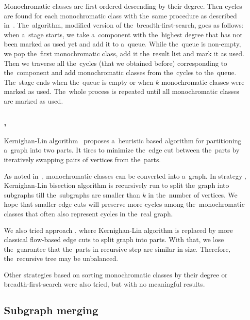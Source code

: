 Monochromatic classes are first ordered descending by their degree.
Then cycles are found for each monochromatic class with the~same procedure
as described in~.
The~algorithm, modified version of the~breadth-first-search, goes as follows:
when a~stage starts, we take a~component with the~highest degree
that has not been marked as used yet and add it to a~queue.
While the~queue is non-empty, we pop the~first monochromatic class,
add it the~result list and mark it as used.
Then we traverse all the~cycles (that we obtained before)
corresponding to the~component
and add monochromatic classes from the~cycles to the~queue.
The~stage ends when the~queue is empty or when \( k \) monochromatic classes
were marked as used. The~whole process is repeated until
all monochromatic classes are marked as used.

\subsubsection*{\KernighanLin{}, \Cuts{}}

Kernighan-Lin algorithm~\cite{kernighan_lin} proposes a~heuristic based algorithm
for partitioning a~graph into two parts. It tires to minimize the~edge cut between
the~parts by iteratively swapping pairs of vertices from the~parts.

As noted in~,
monochromatic classes can be converted into a~graph.
In strategy \KernighanLin{},
Kernighan-Lin bisection algorithm is recursively run to split the~graph
into subgraphs till the~subgraphs are smaller than \( k \) in the~number of vertices.
We hope that smaller-edge cuts will preserve more cycles among
the~monochromatic classes that often also represent cycles in the~real graph.

We also tried approach \Cuts{}, where Kernighan-Lin algorithm is replaced by
more classical flow-based edge cuts to split graph into parts.
With that, we lose the~guarantee that the~parts in recursive step
are similar in size. Therefore, the~recursive tree may be unbalanced.

Other strategies based on
sorting monochromatic classes by their degree
or breadth-first-search were also tried,
but with no meaningful results.



\subsection{Subgraph merging}%
\label{sec:merging}

